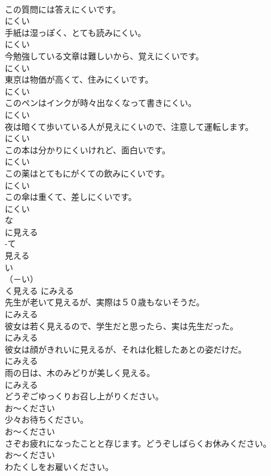\documentclass[8pt]{extreport}
\begin{document}
\begin{CJK}{UTF8}{min}
\\	この質問には答えにくいです。	
\\	にくい
\\	手紙は湿っぽく、とても読みにくい。	
\\	にくい
\\	今勉強している文章は難しいから、覚えにくいです。	
\\	にくい
\\	東京は物価が高くて、住みにくいです。	
\\	にくい
\\	このペンはインクが時々出なくなって書きにくい。	
\\	にくい
\\	夜は暗くて歩いている人が見えにくいので、注意して運転します。	
\\	にくい
\\	この本は分かりにくいけれど、面白いです。	
\\	にくい
\\	この薬はとてもにがくての飲みにくいです。	
\\	にくい
\\	この傘は重くて、差しにくいです。	
\\	にくい
\\	な
\\	に見える	
\\	-て
\\	見える	
\\	い
\\	（－い） 
\\	く見える	にみえる
\\	先生が老いて見えるが、実際は５０歳もないそうだ。	
\\	にみえる
\\	彼女は若く見えるので、学生だと思ったら、実は先生だった。	
\\	にみえる
\\	彼女は顔がきれいに見えるが、それは化粧したあとの姿だけだ。	
\\	にみえる
\\	雨の日は、木のみどりが美しく見える。	
\\	にみえる
\\	どうぞごゆっくりお召し上がりください。	
\\	お～ください
\\	少々お待ちください。	
\\	お～ください
\\	さぞお疲れになったことと存じます。どうぞしばらくお休みください。	
\\	お～ください
\\	わたくしをお雇いください。	

\end{CJK}
\end{document}
